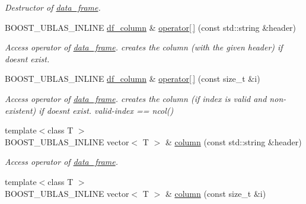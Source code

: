 \begin{DoxyCompactItemize}
\begin{DoxyCompactList}\small\item\em Destructor of \hyperlink{classboost_1_1numeric_1_1ublas_1_1data__frame}{data\+\_\+frame}. \end{DoxyCompactList}\item 
B\+O\+O\+S\+T\+\_\+\+U\+B\+L\+A\+S\+\_\+\+I\+N\+L\+I\+NE \hyperlink{classboost_1_1numeric_1_1ublas_1_1df__column}{df\+\_\+column} \& \hyperlink{classboost_1_1numeric_1_1ublas_1_1data__frame_a7bc6a73935b5d7f0dbdfffdcdae841dd}{operator\mbox{[}$\,$\mbox{]}} (const std\+::string \&header)
\begin{DoxyCompactList}\small\item\em Access operator of \hyperlink{classboost_1_1numeric_1_1ublas_1_1data__frame}{data\+\_\+frame}. creates the column (with the given header) if doesn\textquotesingle{}t exist. \end{DoxyCompactList}\item 
B\+O\+O\+S\+T\+\_\+\+U\+B\+L\+A\+S\+\_\+\+I\+N\+L\+I\+NE \hyperlink{classboost_1_1numeric_1_1ublas_1_1df__column}{df\+\_\+column} \& \hyperlink{classboost_1_1numeric_1_1ublas_1_1data__frame_a58496ee7ebcb0c67457b2c0c476ecec4}{operator\mbox{[}$\,$\mbox{]}} (const size\+\_\+t \&i)
\begin{DoxyCompactList}\small\item\em Access operator of \hyperlink{classboost_1_1numeric_1_1ublas_1_1data__frame}{data\+\_\+frame}. creates the column (if index is valid and non-\/existent) if doesn\textquotesingle{}t exist. valid-\/index == {\ttfamily ncol()} \end{DoxyCompactList}\item 
{\footnotesize template$<$class T $>$ }\\B\+O\+O\+S\+T\+\_\+\+U\+B\+L\+A\+S\+\_\+\+I\+N\+L\+I\+NE vector$<$ T $>$ \& \hyperlink{classboost_1_1numeric_1_1ublas_1_1data__frame_a261a6b02e41c2d5c3e17c7a91c5cb2d5}{column} (const std\+::string \&header)
\begin{DoxyCompactList}\small\item\em Access operator of \hyperlink{classboost_1_1numeric_1_1ublas_1_1data__frame}{data\+\_\+frame}. \end{DoxyCompactList}\item 
{\footnotesize template$<$class T $>$ }\\B\+O\+O\+S\+T\+\_\+\+U\+B\+L\+A\+S\+\_\+\+I\+N\+L\+I\+NE vector$<$ T $>$ \& \hyperlink{classboost_1_1numeric_1_1ublas_1_1data__frame_ac7a4a31485c55e9b3254e1e62ea4c7a8}{column} (const size\+\_\+t \&i)

\end{DoxyCompactItemize}
